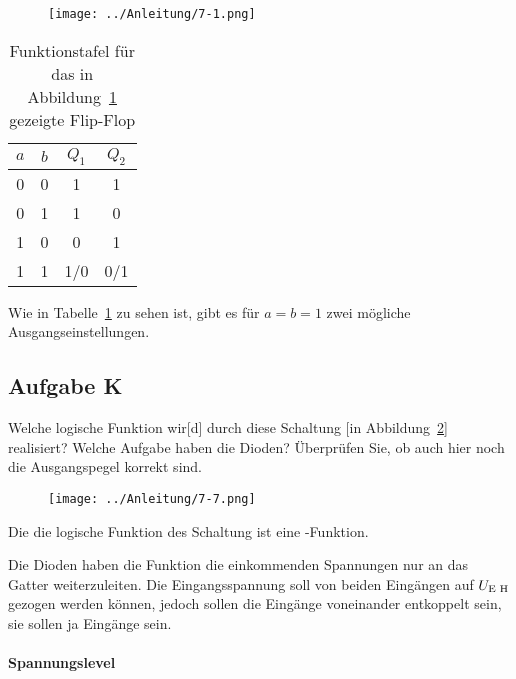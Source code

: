 \begin{figure}
    \centering
    \texttt{[image: ../Anleitung/7-1.png]}
    \caption{%
		\cite[Abbildung~7.1]{physik313-Anleitung}
    }
    \label{fig:7-1}
\end{figure}

\begin{table}
    \centering
    \begin{tabular}{cc|cc}
        $a$ & $b$ & $Q_1$ & $Q_2$ \\
        \hline
        0 & 0 & 1 & 1 \\
        0 & 1 & 1 & 0 \\
        1 & 0 & 0 & 1 \\
        1 & 1 & 1/0 & 0/1
    \end{tabular}
    \caption{%
        Funktionstafel für das in Abbildung~\ref{fig:7-1} gezeigte Flip-Flop 
    }
    \label{tab:Aufgabe_F}
\end{table}

Wie in Tabelle~\ref{tab:Aufgabe_F} zu sehen ist, gibt es für $a = b = 1$ zwei
mögliche Ausgangseinstellungen.

\FloatBarrier
\subsection{Aufgabe K}

\begin{problem}
	Welche logische Funktion wir[d] durch diese Schaltung [in
	Abbildung~\ref{fig:7-7}] realisiert? Welche Aufgabe haben die Dioden?
	Überprüfen Sie, ob auch hier noch die Ausgangspegel korrekt sind.
\end{problem}

\begin{figure}[htbp]
	\centering
	\texttt{[image: ../Anleitung/7-7.png]}
	\caption{%
		\cite[Abbildung~7.7]{physik313-Anleitung}
	}
	\label{fig:7-7}
\end{figure}

Die die logische Funktion des Schaltung ist eine \tnor-Funktion.

Die Dioden
haben die Funktion die einkommenden Spannungen nur an das Gatter
weiterzuleiten. Die Eingangsspannung soll von beiden Eingängen auf $U_\text{E H}$
gezogen werden können, jedoch sollen die Eingänge voneinander entkoppelt sein,
sie sollen ja Eingänge sein.

\paragraph{Spannungslevel}

